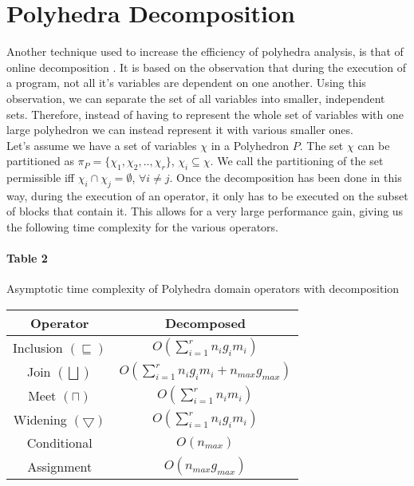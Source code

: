  \section{Polyhedra Decomposition}
Another technique used to increase the efficiency of polyhedra analysis, is that of online decomposition \cite{singh2017fast}. It is based on the observation that during the execution of a program, not all it's variables are dependent on one another. Using this observation, we can separate the set of all variables into smaller, independent sets. Therefore, instead of having to represent the whole set of variables with one large polyhedron we can instead represent it with various smaller ones.\\ Let's assume we have a set of variables $\chi$ in a Polyhedron $P$. The set $\chi$ can be partitioned as $\pi_P=\{ \chi_1,\chi_2,..,\chi_r\}$, $\chi_i\subseteq\chi $. We call the partitioning of the set permissible iff $ \chi_i \cap \chi_j = \emptyset$, $ \forall i \neq j$. Once the decomposition has been done in this way, during the execution of an operator, it only has to be executed on the subset of blocks that contain it. This allows for a very large performance gain, giving us the following time complexity for the various operators.

\paragraph{Table 2} Asymptotic time complexity of Polyhedra domain operators with decomposition

\begin{center}
\begin{tabular}{||c c||} 
 
 \hline
 Operator & Decomposed  \\ [0.5ex] 
 \hline
 Inclusion $(\sqsubseteq)$ & $O(\sum_{i=1}^r n_ig_im_i)$\\ 
 \hline
 Join $(\bigsqcup)$ & $O(\sum_{i=1}^r n_i g_i m_i + n_{max} g_{max})$ \\
 \hline
 Meet $(\sqcap)$ & $O(\sum_{i=1}^r n_i m_i)$ \\
 \hline
 Widening $(\bigtriangledown)$ & $O(\sum_{i=1}^r n_i g_i m_i)$\\
 \hline
 Conditional & $O(n_{max})$ \\ 
 \hline
 Assignment & $O(n_{max}g_{max})$ \\ 
 
 
 \hline
\end{tabular}
\end{center}

